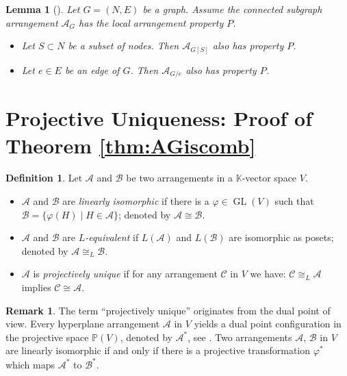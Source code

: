 \documentclass[12pt]{amsart}
\newcommand\CA{{\mathscr A}}
\newcommand\CB{{\mathscr B}}
\newcommand\CC{{\mathscr C}}
\newcommand\BBK{{\mathbb K}}
\newcommand\BBP{{\mathbb P}}
\newcommand\GL{\operatorname{GL}}
\numberwithin{equation}{section}
\theoremstyle{plain}
\newtheorem{lemma}[equation]{Lemma}
\theoremstyle{definition}
\newtheorem{defn}[equation]{Definition}
\newtheorem{remark}[equation]{Remark}
\begin{document}
\begin{lemma}[{\cite[Lem.~6.2, Lem.~6.4]{cuntzkuehne:subgraphs}}]
	\label{lem:local}
	Let $G = (N, E)$ be a graph. Assume
	the connected subgraph arrangement $\CA_G$ has the local arrangement property $P$.
	\begin{itemize}
		\item [(i)]
			Let $S \subset N$ be a subset of nodes. Then $\CA_{G[S]}$ also has property $P$.
		\item [(ii)]
		Let $e \in E$ be an edge of $G$. Then $\CA_{G/e}$ also has property $P$.
	\end{itemize}
\end{lemma}

\section{Projective Uniqueness: Proof of Theorem \ref{thm:AGiscomb}}
\label{s:thm:AGiscomb}

\begin{defn}
	\label{def:projunique}
	Let $\CA$ and $\CB$ be two arrangements in a $\BBK$-vector space $V$.
	\begin{itemize}
		\item[(i)] $\CA$ and $\CB$ are \emph{linearly isomorphic} if there is a $\varphi \in \GL(V)$
		such that $\CB =  \{\varphi(H) \mid H \in \CA\}$; denoted by $\CA \cong \CB$.
		\item[(ii)] $\CA$ and $\CB$ are \emph{$L$-equivalent} if $L(\CA)$ and $L(\CB)$ are isomorphic as posets;
			denoted by $\CA \cong_L \CB$.
		\item[(iii)] $\CA$ is \emph{projectively unique} if for any arrangement $\CC$ in $V$ we have:
			$\CC \cong_L \CA$ implies $\CC \cong \CA$.
	\end{itemize}
\end{defn}

\begin{remark}
	\label{rem:ProjUniqe}
	The term ``projectively unique'' originates from the dual point of view.
	Every hyperplane arrangement $\CA$ in $V$ yields a dual point configuration in the projective space $\BBP(V)$,
	denoted by $\CA^*$, see \cite[\S 2]{ziegler:matroid}.
	Two arrangements $\CA$, $\CB$ in $V$ are linearly isomorphic if and only if there is a projective transformation $\varphi^*$
	which maps $\CA^*$ to $\CB^*$.
\end{remark}
\end{document}
